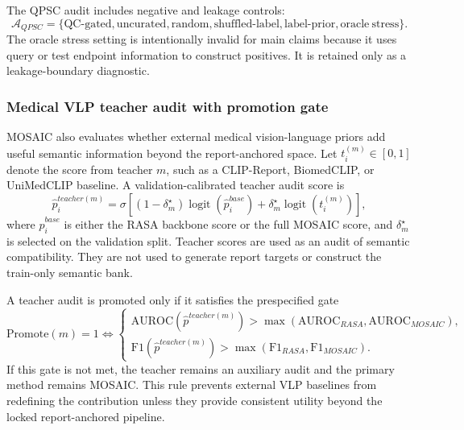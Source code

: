 The QPSC audit includes negative and leakage controls:
\begin{equation}
\mathcal{A}_{QPSC}
=
\{\mathrm{QC\mbox{-}gated},\mathrm{uncurated},\mathrm{random},
\mathrm{shuffled\mbox{-}label},\mathrm{label\mbox{-}prior},
\mathrm{oracle\ stress}\}.
\label{eq:mosaic_qpsc_controls_final_topcs}
\end{equation}
The oracle stress setting is intentionally invalid for main claims because it uses query or test endpoint information to construct positives. It is retained only as a leakage-boundary diagnostic.

\subsubsection{Medical VLP teacher audit with promotion gate}
\label{subsubsec:vse_teacher_final_topcs}

MOSAIC also evaluates whether external medical vision-language priors add useful semantic information beyond the report-anchored space. Let $t_i^{(m)}\in[0,1]$ denote the score from teacher $m$, such as a CLIP-Report, BiomedCLIP, or UniMedCLIP baseline. A validation-calibrated teacher audit score is
\begin{equation}
\hat p_i^{teacher(m)}
=
\sigma\left[
(1-\delta_m^{\star})\operatorname{logit}(\hat p_i^{base})
+
\delta_m^{\star}\operatorname{logit}(t_i^{(m)})
\right],
\label{eq:mosaic_teacher_fusion_final_topcs}
\end{equation}
where $\hat p_i^{base}$ is either the RASA backbone score or the full MOSAIC score, and $\delta_m^{\star}$ is selected on the validation split. Teacher scores are used as an audit of semantic compatibility. They are not used to generate report targets or construct the train-only semantic bank.

A teacher audit is promoted only if it satisfies the prespecified gate
\begin{equation}
\mathrm{Promote}(m)=1
\Longleftrightarrow
\begin{cases}
\mathrm{AUROC}(\hat p^{teacher(m)})>\max(\mathrm{AUROC}_{RASA},\mathrm{AUROC}_{MOSAIC}),\\
\mathrm{F1}(\hat p^{teacher(m)})>\max(\mathrm{F1}_{RASA},\mathrm{F1}_{MOSAIC}).
\end{cases}
\label{eq:mosaic_teacher_promotion_gate_final_topcs}
\end{equation}
If this gate is not met, the teacher remains an auxiliary audit and the primary method remains MOSAIC. This rule prevents external VLP baselines from redefining the contribution unless they provide consistent utility beyond the locked report-anchored pipeline.

